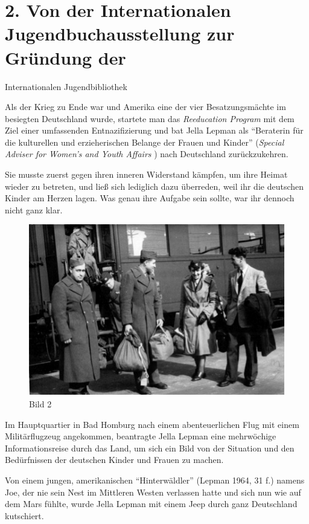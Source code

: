 \documentclass[a4paper,
fontsize=11pt,
oneside,
numbers=noperiodatend,
parskip=half-,
bibliography=totoc,
final
]{scrartcl}
\begin{document}
\section*{2. Von der Internationalen Jugendbuchausstellung zur
Gründung
der}\label{von-der-internationalen-jugendbuchausstellung-zur-gruxfcndung-der}

Internationalen Jugendbibliothek

Als der Krieg zu Ende war und Amerika eine der vier Besatzungsmächte im
besiegten Deutschland wurde, startete man das \emph{Reeducation Program}
mit dem Ziel einer umfassenden Entnazifizierung und bat Jella Lepman als
\enquote{Beraterin für die kulturellen und erzieherischen Belange der
Frauen und Kinder} (\emph{Special Adviser for Women's and Youth Affairs}
) nach Deutschland zurückzukehren.

Sie musste zuerst gegen ihren inneren Widerstand kämpfen, um ihre Heimat
wieder zu betreten, und ließ sich lediglich dazu überreden, weil ihr die
deutschen Kinder am Herzen lagen. Was genau ihre Aufgabe sein sollte,
war ihr dennoch nicht ganz klar.

\begin{figure}[htbp]
\centering
\includegraphics{img/Bild2.jpg}
\caption{Bild 2}
\end{figure}

Im Hauptquartier in Bad Homburg nach einem abenteuerlichen Flug mit
einem Militärflugzeug angekommen, beantragte Jella Lepman eine
mehrwöchige Informationsreise durch das Land, um sich ein Bild von der
Situation und den Bedürfnissen der deutschen Kinder und Frauen zu
machen.

Von einem jungen, amerikanischen \enquote{Hinterwäldler} (Lepman 1964,
31 f.) namens Joe, der nie sein Nest im Mittleren Westen verlassen hatte
und sich nun wie auf dem Mars fühlte, wurde Jella Lepman mit einem Jeep
durch ganz Deutschland kutschiert.~
\end{document}

